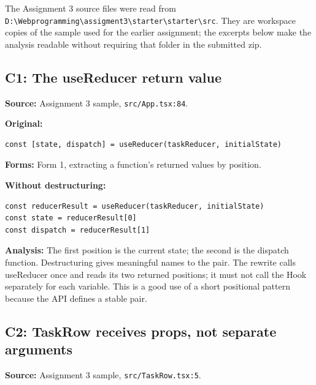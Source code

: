 \documentclass[10pt,a4paper]{article}
\begin{document}
The Assignment 3 source files were read from \texttt{D:\allowbreak{}\textbackslash{}\allowbreak{}Webprogramming\textbackslash{}\allowbreak{}assigment3\textbackslash{}\allowbreak{}starter\textbackslash{}\allowbreak{}starter\textbackslash{}\allowbreak{}src}. They are workspace copies of the sample used for the earlier assignment; the excerpts below make the analysis readable without requiring that folder in the submitted zip.

\subsection{C1: The useReducer return value}

\textbf{Source:} Assignment 3 sample, \texttt{src/\allowbreak{}App.\allowbreak{}tsx:\allowbreak{}84}.


\textbf{Original:}

\begin{lstlisting}[language=GuideJS]
const [state, dispatch] = useReducer(taskReducer, initialState)
\end{lstlisting}

\textbf{Forms:} Form 1, extracting a function's returned values by position.


\textbf{Without destructuring:}

\begin{lstlisting}[language=GuideJS]
const reducerResult = useReducer(taskReducer, initialState)
const state = reducerResult[0]
const dispatch = reducerResult[1]
\end{lstlisting}

\textbf{Analysis:} The first position is the current state; the second is the dispatch function. Destructuring gives meaningful names to the pair. The rewrite calls useReducer once and reads its two returned positions; it must not call the Hook separately for each variable. This is a good use of a short positional pattern because the API defines a stable pair.

\subsection{C2: TaskRow receives props, not separate arguments}

\textbf{Source:} Assignment 3 sample, \texttt{src/\allowbreak{}Task\allowbreak{}Row.\allowbreak{}tsx:\allowbreak{}5}.
\end{document}
